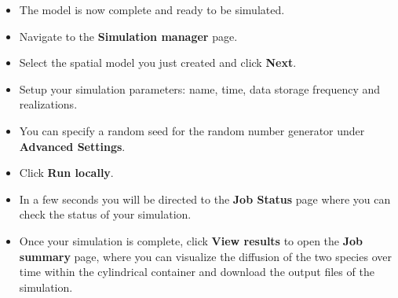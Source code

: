 \begin{itemize}

 
\item The model is now complete and ready to be simulated.

\item Navigate to the \textbf{Simulation manager} page.

\item Select the spatial model you just created and click \textbf{Next}.
\item Setup your simulation parameters: name, time, data storage frequency and realizations. 
\item You can specify a random seed for the random number generator under \textbf{Advanced Settings}.
\item Click \textbf{Run locally}.
\item In a few seconds you will be directed to the \textbf{Job Status} page where you can check the status of your simulation.
\item Once your simulation is complete, click \textbf{View results} to open the \textbf{Job summary} page, where you can visualize the diffusion of the two species over time within the cylindrical container and download the output files of the simulation.

\end{itemize}



